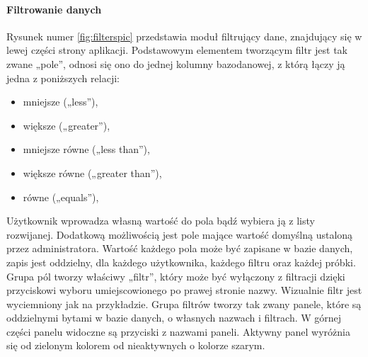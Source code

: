 \documentclass[a4paper,12pt,twoside]{article}
\begin{document}
\newpage
\paragraph{Filtrowanie danych}
Rysunek numer \ref{fig:filterspic} przedstawia moduł filtrujący dane, znajdujący się w
lewej części strony aplikacji.
Podstawowym elementem tworzącym filtr jest tak zwane „pole”, odnosi się ono do jednej kolumny
bazodanowej, z którą łączy ją jedna z poniższych relacji:

\begin{itemize}
\item mniejsze („less”),
\item większe („greater”),
\item mniejsze równe („less than”),
\item większe równe („greater than”),
\item równe („equals”),
\end{itemize}

Użytkownik wprowadza własną wartość do pola bądź wybiera ją z listy rozwijanej.
Dodatkową możliwością jest pole mające wartość domyślną ustaloną przez administratora.
Wartość każdego pola może być zapisane w bazie danych, zapis jest oddzielny, dla każdego
użytkownika, każdego filtru oraz każdej próbki.
Grupa pól tworzy właściwy „filtr”, który może być wyłączony z filtracji dzięki
przyciskowi wyboru umiejscowionego po prawej stronie nazwy. Wizualnie filtr jest wyciemniony jak na przykładzie.
Grupa filtrów tworzy tak zwany panele, które są oddzielnymi bytami w bazie danych, o własnych nazwach i filtrach.
W górnej części panelu widoczne są przyciski z nazwami paneli. Aktywny panel
wyróżnia się od zielonym kolorem od nieaktywnych o kolorze szarym.
\end{document}
